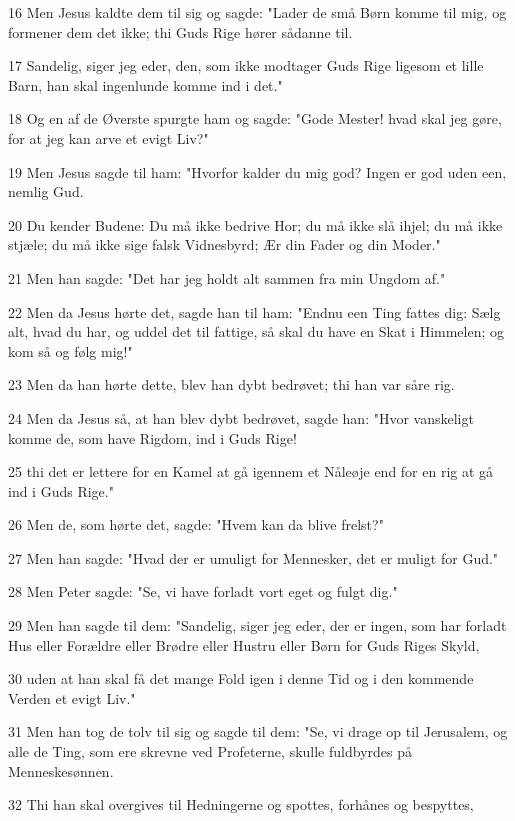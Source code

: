 \par 16 Men Jesus kaldte dem til sig og sagde: "Lader de små Børn komme til mig, og formener dem det ikke; thi Guds Rige hører sådanne til.
\par 17 Sandelig, siger jeg eder, den, som ikke modtager Guds Rige ligesom et lille Barn, han skal ingenlunde komme ind i det."
\par 18 Og en af de Øverste spurgte ham og sagde: "Gode Mester! hvad skal jeg gøre, for at jeg kan arve et evigt Liv?"
\par 19 Men Jesus sagde til ham: "Hvorfor kalder du mig god? Ingen er god uden een, nemlig Gud.
\par 20 Du kender Budene: Du må ikke bedrive Hor; du må ikke slå ihjel; du må ikke stjæle; du må ikke sige falsk Vidnesbyrd; Ær din Fader og din Moder."
\par 21 Men han sagde: "Det har jeg holdt alt sammen fra min Ungdom af."
\par 22 Men da Jesus hørte det, sagde han til ham: "Endnu een Ting fattes dig: Sælg alt, hvad du har, og uddel det til fattige, så skal du have en Skat i Himmelen; og kom så og følg mig!"
\par 23 Men da han hørte dette, blev han dybt bedrøvet; thi han var såre rig.
\par 24 Men da Jesus så, at han blev dybt bedrøvet, sagde han: "Hvor vanskeligt komme de, som have Rigdom, ind i Guds Rige!
\par 25 thi det er lettere for en Kamel at gå igennem et Nåleøje end for en rig at gå ind i Guds Rige."
\par 26 Men de, som hørte det, sagde: "Hvem kan da blive frelst?"
\par 27 Men han sagde: "Hvad der er umuligt for Mennesker, det er muligt for Gud."
\par 28 Men Peter sagde: "Se, vi have forladt vort eget og fulgt dig."
\par 29 Men han sagde til dem: "Sandelig, siger jeg eder, der er ingen, som har forladt Hus eller Forældre eller Brødre eller Hustru eller Børn for Guds Riges Skyld,
\par 30 uden at han skal få det mange Fold igen i denne Tid og i den kommende Verden et evigt Liv."
\par 31 Men han tog de tolv til sig og sagde til dem: "Se, vi drage op til Jerusalem, og alle de Ting, som ere skrevne ved Profeterne, skulle fuldbyrdes på Menneskesønnen.
\par 32 Thi han skal overgives til Hedningerne og spottes, forhånes og bespyttes,
